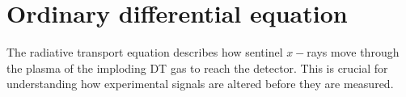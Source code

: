 \section{\label{sec:ODE}Ordinary differential equation}

The radiative transport equation describes how sentinel $x-$rays move through the plasma of the imploding DT gas to reach the detector. This is crucial for understanding how experimental signals are altered before they are measured.




\endinput %